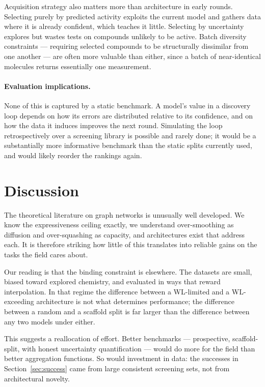 \documentclass[11pt,a4paper]{article}
\begin{document}
Acquisition strategy also matters more than architecture in early rounds.
Selecting purely by predicted activity exploits the current model and gathers
data where it is already confident, which teaches it little. Selecting by
uncertainty explores but wastes tests on compounds unlikely to be active.
Batch diversity constraints --- requiring selected compounds to be
structurally dissimilar from one another --- are often more valuable than
either, since a batch of near-identical molecules returns essentially one
measurement.

\paragraph{Evaluation implications.}
None of this is captured by a static benchmark. A model's value in a discovery
loop depends on how its errors are distributed relative to its confidence, and
on how the data it induces improves the next round. Simulating the loop
retrospectively over a screening library is possible and rarely done; it would
be a substantially more informative benchmark than the static splits currently
used, and would likely reorder the rankings again.

\section{Discussion}
\label{sec:discussion}

The theoretical literature on graph networks is unusually well developed.
We know the expressiveness ceiling exactly, we understand over-smoothing as
diffusion and over-squashing as capacity, and architectures exist that address
each. It is therefore striking how little of this translates into reliable
gains on the tasks the field cares about.

Our reading is that the binding constraint is elsewhere. The datasets are
small, biased toward explored chemistry, and evaluated in ways that reward
interpolation. In that regime the difference between a WL-limited and a
WL-exceeding architecture is not what determines performance; the difference
between a random and a scaffold split is far larger than the difference
between any two models under either.

This suggests a reallocation of effort. Better benchmarks --- prospective,
scaffold-split, with honest uncertainty quantification --- would do more for
the field than better aggregation functions. So would investment in data:
the successes in Section~\ref{sec:success} came from large consistent
screening sets, not from architectural novelty.
\end{document}
